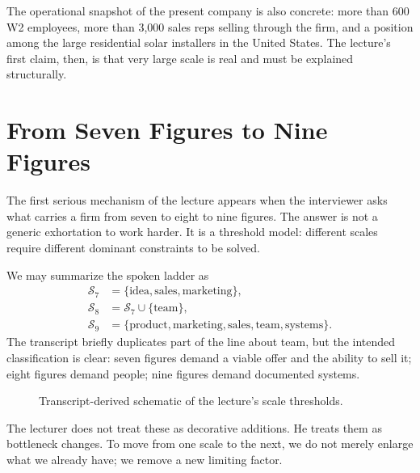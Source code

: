 The operational snapshot of the present company is also concrete: more than 600 W2 employees, more than 3,000 sales reps selling through the firm, and a position among the large residential solar installers in the United States. The lecture's first claim, then, is that very large scale is real and must be explained structurally.

\section{From Seven Figures to Nine Figures}

The first serious mechanism of the lecture appears when the interviewer asks what carries a firm from seven to eight to nine figures. The answer is not a generic exhortation to work harder. It is a threshold model: different scales require different dominant constraints to be solved.

We may summarize the spoken ladder as
\begin{align}
\mathcal{S}_7 &= \{\text{idea},\text{sales},\text{marketing}\},\\
\mathcal{S}_8 &= \mathcal{S}_7 \cup \{\text{team}\},\\
\mathcal{S}_9 &= \{\text{product},\text{marketing},\text{sales},\text{team},\text{systems}\}.
\end{align}
The transcript briefly duplicates part of the line about team, but the intended classification is clear: seven figures demand a viable offer and the ability to sell it; eight figures demand people; nine figures demand documented systems.

\begin{figure}[h]
\centering
{}
\caption{Transcript-derived schematic of the lecture's scale thresholds.}
\end{figure}

The lecturer does not treat these as decorative additions. He treats them as bottleneck changes. To move from one scale to the next, we do not merely enlarge what we already have; we remove a new limiting factor.

